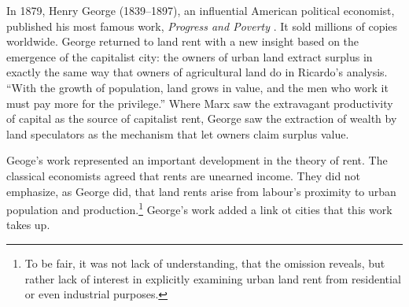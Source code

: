 In 1879, Henry George (1839--1897), an influential American political economist, published his most famous work, \textit{Progress and Poverty} \cite{georgeProgressPovertyInquiry1973}. It sold millions of copies worldwide. George returned to land rent with a new insight based on the emergence of the capitalist city: the owners of urban land extract surplus in exactly the same way that owners of agricultural land do in Ricardo's analysis. ``With the growth of population, land grows in value, and the men who work it must pay more for the privilege.''  Where Marx saw the extravagant productivity of capital as the source of capitalist rent, George saw the extraction of wealth by land speculators as the mechanism that let owners claim surplus value. %

Geoge's work represented an important development in the theory of rent. The classical economists agreed that rents are unearned income. They did not emphasize, as George did, that land rents arise from labour's proximity to urban population and production.\footnote{To be fair, it was not lack of understanding, that the omission reveals, but rather lack of interest in explicitly examining urban land rent from residential or even industrial purposes.} George's work added a link ot cities that this work takes up.  %

